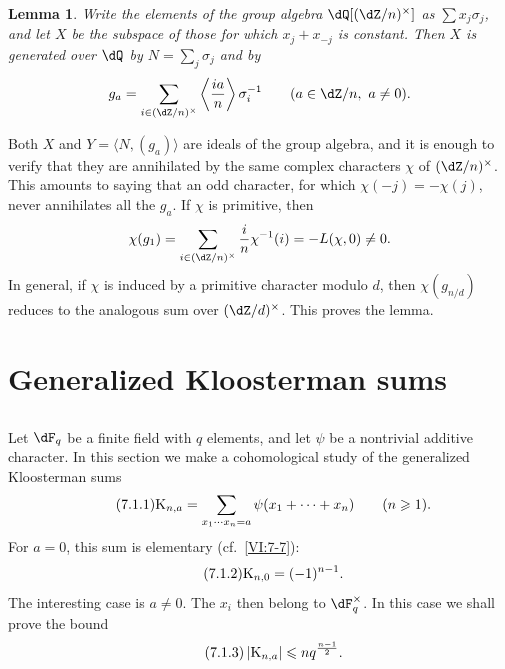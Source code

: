 \documentclass[12pt,oneside,english]{smfbook}
\newcounter{char}
\newcommand{\kloos}{\textnormal{K}} %
\newtheorem{lemma_}[subsection]{Lemma}
\begin{document}
\begin{lemma_}\label{VI:6-12}
Write the elements of the group algebra $\dQ[(\dZ/n)^\times]$ as $\sum x_j\sigma_j$, and let $X$ be the subspace of those for which $x_j+x_{-j}$ is constant. Then $X$ is generated over $\dQ$ by $N=\sum_j\sigma_j$ and by
\[
  g_a=\sum_{i\in(\dZ/n)^\times}
      \left\langle\frac{ia}{n}\right\rangle\sigma_i^{-1}
  \qquad(a\in\dZ/n,\ a\ne0).
\]
\end{lemma_}

Both $X$ and $Y=\langle N,(g_a)\rangle$ are ideals of the group algebra, and it is enough to verify that they are annihilated by the same complex characters $\chi$ of $(\dZ/n)^\times$. This amounts to saying that an odd character, for which $\chi(-j)=-\chi(j)$, never annihilates all the $g_a$. If $\chi$ is primitive, then
\[
  \chi(g_1)=\sum_{i\in(\dZ/n)^\times}\frac{i}{n}\chi^{-1}(i)
  =-L(\chi,0)\ne0.
\]
In general, if $\chi$ is induced by a primitive character modulo $d$, then $\chi(g_{n/d})$ reduces to the analogous sum over $(\dZ/d)^\times$. This proves the lemma.

\section{Generalized Kloosterman sums}\label{VI:7}

\subsection{}\label{VI:7-1}

Let $\dF_q$ be a finite field with $q$ elements, and let $\psi$ be a nontrivial additive character. In this section we make a cohomological study of the generalized Kloosterman sums
\begin{equation*}\tag{7.1.1}\label{VI;eq:7-1-1}
  \kloos_{n,a} = \sum_{x_1\dotsm x_n = a} \psi(x_1+\cdots + x_n) \qquad (n\geqslant 1) \text{.}
\end{equation*}
For $a=0$, this sum is elementary (cf.\ \ref{VI:7-7}):
\begin{equation*}\tag{7.1.2}\label{VI:eq:7-1-2}
  \kloos_{n,0} = (-1)^{n-1} \text{.}
\end{equation*}
The interesting case is $a\ne0$. The $x_i$ then belong to $\dF_q^\times$. In this case we shall prove the bound
\begin{equation*}\tag{7.1.3}\label{VI:eq:7-1-3}
  \left|\kloos_{n,a}\right|\leqslant n q^{\frac{n-1}{2}}.
\end{equation*}
\end{document}

